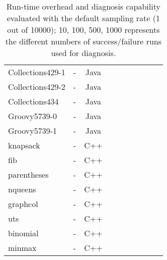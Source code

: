 \begin{table}[h!]
\begin{tabular}{lccccccccc}
    Collections429-1    &  -  & Java  &  &              &    &                                 &                   &                           &                                \\
    Collections429-2    &  -  & Java  &  &              &    &                                 &                   &                           &                                \\
    Collections434    & -   & Java  &  &              &    &                                 &                   &                           &                                \\
    \midrule
    Groovy5739-0      & -  & Java  &  &              &    &                                 &                   &                           &                                \\
    Groovy5739-1      & -  & Java  &  &              &    &                                 &                   &                           &                               \\
    \midrule
    \midrule
    knapsack      &  -  & C++  &  &              &    &                                 &                   &                           &                              \\
    fib      &  - & C++  &  &              &    &                                 &                   &                           &                                \\
    parentheses      & -   & C++  &  &              &    &                                 &                   &                           &                                \\
    nqueens      &  -  & C++  &  &              &    &                                 &                   &                           &                                \\
    graphcol      &  -  & C++  &  &              &    &                                 &                   &                           &                              \\
    uts      &  -  & C++  &  &              &    &                                 &                   &                           &                               \\
    binomial      &  -  & C++  &  &              &    &                                 &                   &                           &                                \\
    minmax      &  -  & C++  &  &              &    &                                 &                   &                           &                               \\


    \bottomrule
   \end{tabular}
  \caption{Run-time overhead and diagnosis capability evaluated with the default sampling rate (1 out of 10000); 10, 100, 500, 1000 represents the different numbers of success/failure runs used for diagnosis.}
  \label{tab:LBR}
\end{table}